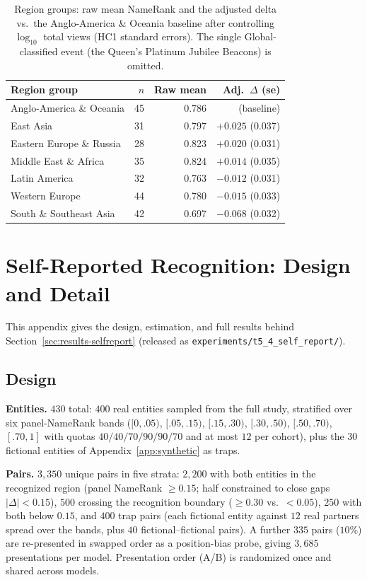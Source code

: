 \begin{table}[!htbp]
\centering
\small
\caption{Region groups: raw mean NameRank and the adjusted delta vs.\ the Anglo-America \& Oceania baseline after controlling $\log_{10}$ total views (HC1 standard errors). The single Global-classified event (the Queen's Platinum Jubilee Beacons) is omitted.}
\label{tab:events-region}
\begin{tabular}{lrrr}
\toprule
Region group & $n$ & Raw mean & Adj.\ $\Delta$ (se) \\
\midrule
Anglo-America \& Oceania & 45 & 0.786 & (baseline) \\
East Asia & 31 & 0.797 & $+0.025$ (0.037) \\
Eastern Europe \& Russia & 28 & 0.823 & $+0.020$ (0.031) \\
Middle East \& Africa & 35 & 0.824 & $+0.014$ (0.035) \\
Latin America & 32 & 0.763 & $-0.012$ (0.031) \\
Western Europe & 44 & 0.780 & $-0.015$ (0.033) \\
South \& Southeast Asia & 42 & 0.697 & $-0.068$ (0.032) \\
\bottomrule
\end{tabular}
\end{table}


\section{Self-Reported Recognition: Design and Detail}
\label{app:selfreport}

This appendix gives the design, estimation, and full results behind Section~\ref{sec:results-selfreport} (released as \texttt{experiments/t5\_4\_self\_report/}).

\subsection{Design}

\textbf{Entities.} $430$ total: $400$ real entities sampled from the full study, stratified over six panel-NameRank bands ($[0,.05)$, $[.05,.15)$, $[.15,.30)$, $[.30,.50)$, $[.50,.70)$, $[.70,1]$ with quotas $40/40/70/90/90/70$ and at most $12$ per cohort), plus the $30$ fictional entities of Appendix~\ref{app:synthetic} as traps.

\textbf{Pairs.} $3{,}350$ unique pairs in five strata: $2{,}200$ with both entities in the recognized region (panel NameRank $\ge 0.15$; half constrained to close gaps $|\Delta| < 0.15$), $500$ crossing the recognition boundary ($\ge 0.30$ vs.\ $< 0.05$), $250$ with both below $0.15$, and $400$ trap pairs (each fictional entity against $12$ real partners spread over the bands, plus $40$ fictional--fictional pairs). A further $335$ pairs ($10\%$) are re-presented in swapped order as a position-bias probe, giving $3{,}685$ presentations per model. Presentation order (A/B) is randomized once and shared across models.

